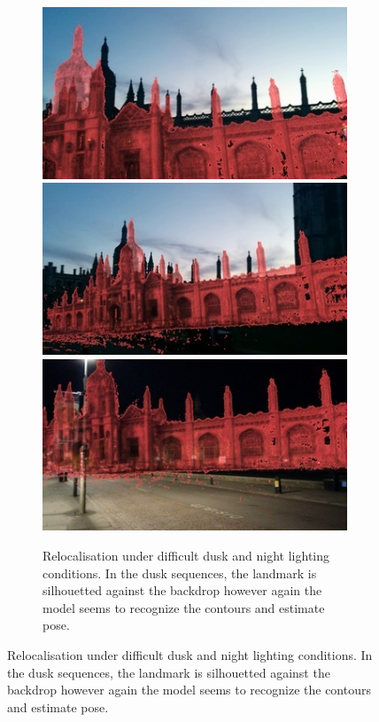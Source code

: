 \begin{figure}[p]
\begin{center}
\begin{subfigure}[b]{\textwidth}
{   	\includegraphics[width=0.24\linewidth]{ICCV/fram00048pngoverlay}
   	\includegraphics[width=0.24\linewidth]{ICCV/fram00054pngoverlay}
   	\includegraphics[width=0.24\linewidth]{ICCV/IMG_20150418_230453jpgoverlay}
   	}
   \caption{Relocalisation under difficult dusk and night lighting conditions. In the dusk sequences, the landmark is silhouetted against the backdrop however again the model seems to recognize the contours and estimate pose.}
\end{subfigure}


\end{center}
\end{figure}
